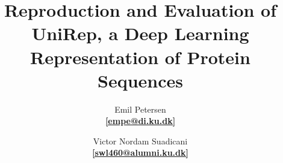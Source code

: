 \title{
    \Huge{\textbf{Reproduction and Evaluation of UniRep, a Deep Learning Representation of Protein Sequences}} \\
}

\author{\Large{Emil Petersen} \\ \href{mailto:empe@di.ku.dk}{\textbf{[empe@di.ku.dk]}} \and \Large{Victor Nordam Suadicani} \\ \href{mailto:nordam@di.ku.dk}{\textbf{[swl460@alumni.ku.dk]}}
}




\maketitle

\thispagestyle{empty}

\newpage
\setcounter{page}{1}
